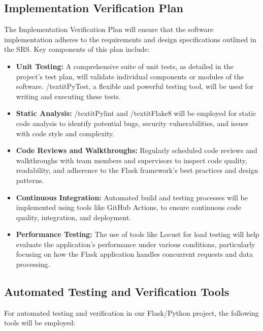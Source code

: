 \documentclass[12pt, titlepage]{article}
\begin{document}
\subsection{Implementation Verification Plan}

The Implementation Verification Plan will ensure that the software implementation adheres to the requirements and design specifications outlined in the SRS. Key components of this plan include:

\begin{itemize}
    \item \textbf{Unit Testing:} A comprehensive suite of unit tests, as detailed in the project's test plan, will validate individual components or modules of the software. /textit{PyTest}, a flexible and powerful testing tool, will be used for writing and executing these tests.
    \item \textbf{Static Analysis:} /textit{Pylint} and /textit{Flake8} will be employed for static code analysis to identify potential bugs, security vulnerabilities, and issues with code style and complexity.
    \item \textbf{Code Reviews and Walkthroughs:} Regularly scheduled code reviews and walkthroughs with team members and supervisors to inspect code quality, readability, and adherence to the Flask framework's best practices and design patterns.
    \item \textbf{Continuous Integration:} Automated build and testing processes will be implemented using tools like GitHub Actions, to ensure continuous code quality, integration, and deployment.
    \item \textbf{Performance Testing:} The use of tools like Locust for load testing will help evaluate the application's performance under various conditions, particularly focusing on how the Flask application handles concurrent requests and data processing.
\end{itemize}

\subsection{Automated Testing and Verification Tools}

For automated testing and verification in our Flask/Python project, the following tools will be employed:
\end{document}
